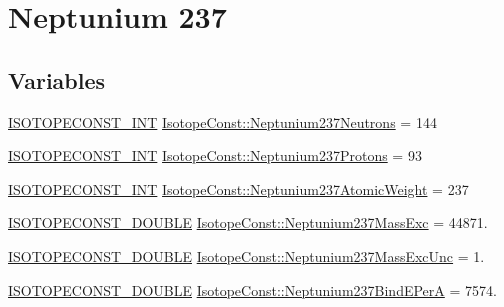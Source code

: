 \hypertarget{group___isotope_const-_neptunium-_np237}{}\section{Neptunium 237}
\label{group___isotope_const-_neptunium-_np237}
\subsection*{Variables}
\begin{DoxyCompactItemize}
\item 
\mbox{\hyperlink{group___isotope_const-_macros_ga5f18360b3e99483a35c32d789e62621c}{I\+S\+O\+T\+O\+P\+E\+C\+O\+N\+S\+T\+\_\+\+I\+NT}} \mbox{\hyperlink{group___isotope_const-_neptunium-_np237_gac35b14852937390cbec28a96f0ef040a}{Isotope\+Const\+::\+Neptunium237\+Neutrons}} = 144
\item 
\mbox{\hyperlink{group___isotope_const-_macros_ga5f18360b3e99483a35c32d789e62621c}{I\+S\+O\+T\+O\+P\+E\+C\+O\+N\+S\+T\+\_\+\+I\+NT}} \mbox{\hyperlink{group___isotope_const-_neptunium-_np237_gabff24921e9f950a636fb73effafca0da}{Isotope\+Const\+::\+Neptunium237\+Protons}} = 93
\item 
\mbox{\hyperlink{group___isotope_const-_macros_ga5f18360b3e99483a35c32d789e62621c}{I\+S\+O\+T\+O\+P\+E\+C\+O\+N\+S\+T\+\_\+\+I\+NT}} \mbox{\hyperlink{group___isotope_const-_neptunium-_np237_ga3639920fdcd6907eb02e7d893133495f}{Isotope\+Const\+::\+Neptunium237\+Atomic\+Weight}} = 237
\item 
\mbox{\hyperlink{group___isotope_const-_macros_ga8f45a7272ce02c0b4c65c44636ed719a}{I\+S\+O\+T\+O\+P\+E\+C\+O\+N\+S\+T\+\_\+\+D\+O\+U\+B\+LE}} \mbox{\hyperlink{group___isotope_const-_neptunium-_np237_ga9516d6f1aa80aa69c542f74d213d2ef9}{Isotope\+Const\+::\+Neptunium237\+Mass\+Exc}} = 44871.
\item 
\mbox{\hyperlink{group___isotope_const-_macros_ga8f45a7272ce02c0b4c65c44636ed719a}{I\+S\+O\+T\+O\+P\+E\+C\+O\+N\+S\+T\+\_\+\+D\+O\+U\+B\+LE}} \mbox{\hyperlink{group___isotope_const-_neptunium-_np237_ga32a09b5776683e26d8beafdec5f374cb}{Isotope\+Const\+::\+Neptunium237\+Mass\+Exc\+Unc}} = 1.
\item 
\mbox{\hyperlink{group___isotope_const-_macros_ga8f45a7272ce02c0b4c65c44636ed719a}{I\+S\+O\+T\+O\+P\+E\+C\+O\+N\+S\+T\+\_\+\+D\+O\+U\+B\+LE}} \mbox{\hyperlink{group___isotope_const-_neptunium-_np237_ga440cbe54c626033e032d52f294732f6b}{Isotope\+Const\+::\+Neptunium237\+Bind\+E\+PerA}} = 7574.
\item 

\end{DoxyCompactItemize}
